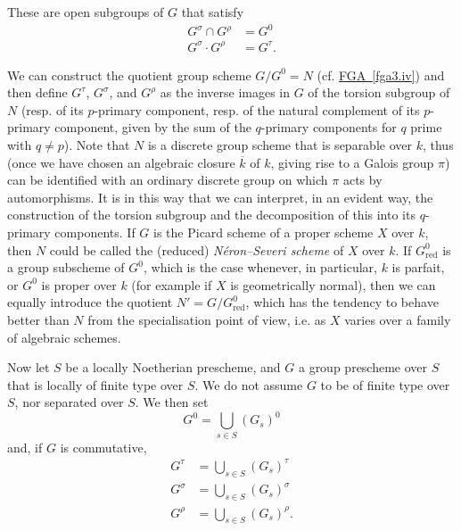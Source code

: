   These are open subgroups of \(G\) that satisfy
  \[     \begin {aligned}       G^\sigma  \cap  G^\rho        &= G^0     \\G^\sigma  \cdot  G^\rho        &= G^\tau .     \end {aligned}   \]\begin{remark}{}\label{fga3.vi-1-remark}\skipsinglepar\par{}We can construct the quotient group scheme \(G/G^0=N\) (cf. \hyperref[fga3.iv]{FGA~\ref*{fga3.iv}}) and then define \(G^\tau \), \(G^\sigma \), and \(G^\rho \) as the inverse images in \(G\) of the torsion subgroup of \(N\) (resp. of its \(p\)-primary component, resp. of the natural complement of its \(p\)-primary component, given by the sum of the \(q\)-primary components for \(q\) prime with \(q\neq  p\)).
    Note that \(N\) is a discrete group scheme that is separable over \(k\), thus (once we have chosen an algebraic closure \(\overline {k}\) of \(k\), giving rise to a Galois group \(\pi \)) can be identified with an ordinary discrete group on which \(\pi \) acts by automorphisms.
    It is in this way that we can interpret, in an evident way, the construction of the torsion subgroup and the decomposition of this into its \(q\)-primary components.
    If \(G\) is the Picard scheme of a proper scheme \(X\) over \(k\), then \(N\) could be called the (reduced) \emph{Néron–Severi scheme} of \(X\) over \(k\).
    If \(G_\mathrm {red}^0\) is a group subscheme of \(G^0\), which is the case whenever, in particular, \(k\) is parfait, or \(G^0\) is proper over \(k\) (for example if \(X\) is geometrically normal), then we can equally introduce the quotient \(N'=G/G_\mathrm {red}^0\), which has the tendency to behave better than \(N\) from the specialisation point of view, i.e. as \(X\) varies over a family of algebraic schemes.\end{remark}\par{}Now let \(S\) be a locally Noetherian prescheme, and \(G\) a group prescheme over \(S\) that is locally of finite type over \(S\).
  We do not assume \(G\) to be of finite type over \(S\), nor separated over \(S\).
  We then set
  \[     G^0     = \bigcup _{s\in  S} (G_s)^0   \]
  and, if \(G\) is commutative,
  \[     \begin {aligned}       G^\tau        &= \bigcup _{s\in  S} (G_s)^\tau      \\G^\sigma        &= \bigcup _{s\in  S} (G_s)^\sigma      \\G^\rho        &= \bigcup _{s\in  S} (G_s)^\rho .     \end {aligned}   \]
  
